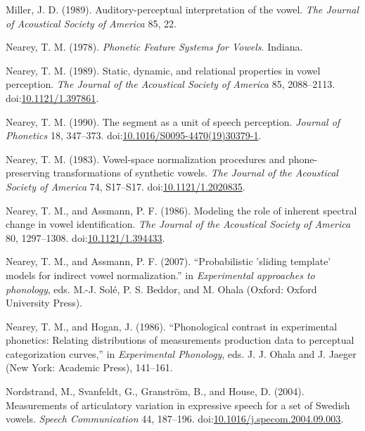\documentclass[utf8]{frontiersSCNS}
\newlength{\cslhangindent}
\newlength{\cslentryspacingunit} %
\newenvironment{CSLReferences}[2] %
 {%
  \setlength{\parindent}{0pt}
  \ifodd #1
  \let\oldpar\par
  \def\par{\hangindent=\cslhangindent\oldpar}
  \fi
  \setlength{\parskip}{#2\cslentryspacingunit}
 }%
 {}
\begin{document}
\begin{CSLReferences}{1}{0}
\leavevmode{}%
Miller, J. D. (1989). Auditory-perceptual interpretation of the vowel. \emph{The Journal of Acoustical Society of America} 85, 22.

\leavevmode{}%
Nearey, T. M. (1978). \emph{Phonetic {Feature Systems} for {Vowels}}. {Indiana}.

\leavevmode{}%
Nearey, T. M. (1989). Static, dynamic, and relational properties in vowel perception. \emph{The Journal of the Acoustical Society of America} 85, 2088--2113. doi:\href{https://doi.org/10.1121/1.397861}{10.1121/1.397861}.

\leavevmode{}%
Nearey, T. M. (1990). The segment as a unit of speech perception. \emph{Journal of Phonetics} 18, 347--373. doi:\href{https://doi.org/10.1016/S0095-4470(19)30379-1}{10.1016/S0095-4470(19)30379-1}.

\leavevmode{}%
Nearey, T. M. (1983). Vowel-space normalization procedures and phone-preserving transformations of synthetic vowels. \emph{The Journal of the Acoustical Society of America} 74, S17--S17. doi:\href{https://doi.org/10.1121/1.2020835}{10.1121/1.2020835}.

\leavevmode{}%
Nearey, T. M., and Assmann, P. F. (1986). Modeling the role of inherent spectral change in vowel identification. \emph{The Journal of the Acoustical Society of America} 80, 1297--1308. doi:\href{https://doi.org/10.1121/1.394433}{10.1121/1.394433}.

\leavevmode{}%
Nearey, T. M., and Assmann, P. F. (2007). {``Probabilistic 'sliding template' models for indirect vowel normalization.''} in \emph{Experimental approaches to phonology}, eds. M.-J. Solé, P. S. Beddor, and M. Ohala ({Oxford}: {Oxford University Press}).

\leavevmode{}%
Nearey, T. M., and Hogan, J. (1986). {``Phonological contrast in experimental phonetics: Relating distributions of measurements production data to perceptual categorization curves,''} in \emph{Experimental {Phonology}}, eds. J. J. Ohala and J. Jaeger ({New York}: {Academic Press}), 141--161.

\leavevmode{}%
Nordstrand, M., Svanfeldt, G., Granström, B., and House, D. (2004). Measurements of articulatory variation in expressive speech for a set of {Swedish} vowels. \emph{Speech Communication} 44, 187--196. doi:\href{https://doi.org/10.1016/j.specom.2004.09.003}{10.1016/j.specom.2004.09.003}.


\end{CSLReferences}
\end{document}
